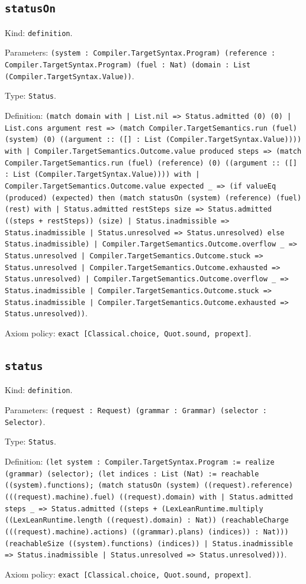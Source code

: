 \documentclass[11pt]{article}
\begin{document}
\subsection*{\texttt{statusOn}}
\noindent Kind: \texttt{definition}.\par
\noindent Parameters: \texttt{(system : Compiler.TargetSyntax.Program) (reference : Compiler.TargetSyntax.Program) (fuel : Nat) (domain : List (Compiler.TargetSyntax.Value))}.\par
\noindent Type: \texttt{Status}.\par
\noindent Definition: \texttt{(match domain with | List.nil => Status.admitted (0) (0) | List.cons argument rest => (match Compiler.TargetSemantics.run (fuel) (system) (0) ((argument :: ([] : List (Compiler.TargetSyntax.Value)))) with | Compiler.TargetSemantics.Outcome.value produced steps => (match Compiler.TargetSemantics.run (fuel) (reference) (0) ((argument :: ([] : List (Compiler.TargetSyntax.Value)))) with | Compiler.TargetSemantics.Outcome.value expected \_ => (if valueEq (produced) (expected) then (match statusOn (system) (reference) (fuel) (rest) with | Status.admitted restSteps size => Status.admitted ((steps + restSteps)) (size) | Status.inadmissible => Status.inadmissible | Status.unresolved => Status.unresolved) else Status.inadmissible) | Compiler.TargetSemantics.Outcome.overflow \_ => Status.unresolved | Compiler.TargetSemantics.Outcome.stuck => Status.unresolved | Compiler.TargetSemantics.Outcome.exhausted => Status.unresolved) | Compiler.TargetSemantics.Outcome.overflow \_ => Status.inadmissible | Compiler.TargetSemantics.Outcome.stuck => Status.inadmissible | Compiler.TargetSemantics.Outcome.exhausted => Status.unresolved))}.\par
\noindent Axiom policy: \texttt{exact [Classical.choice, Quot.sound, propext]}.\par
\subsection*{\texttt{status}}
\noindent Kind: \texttt{definition}.\par
\noindent Parameters: \texttt{(request : Request) (grammar : Grammar) (selector : Selector)}.\par
\noindent Type: \texttt{Status}.\par
\noindent Definition: \texttt{(let system : Compiler.TargetSyntax.Program := realize (grammar) (selector); (let indices : List (Nat) := reachable ((system).functions); (match statusOn (system) ((request).reference) (((request).machine).fuel) ((request).domain) with | Status.admitted steps \_ => Status.admitted ((steps + (LexLeanRuntime.multiply ((LexLeanRuntime.length ((request).domain) : Nat)) (reachableCharge (((request).machine).actions) ((grammar).plans) (indices)) : Nat))) (reachableSize ((system).functions) (indices)) | Status.inadmissible => Status.inadmissible | Status.unresolved => Status.unresolved)))}.\par
\noindent Axiom policy: \texttt{exact [Classical.choice, Quot.sound, propext]}.\par
\end{document}
